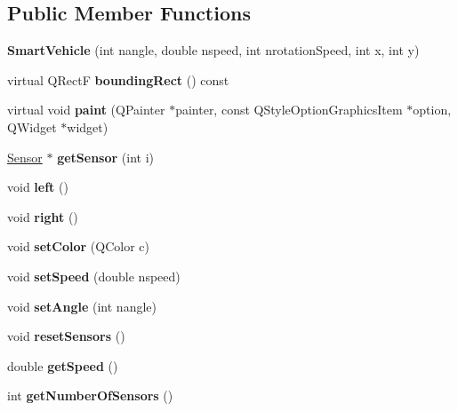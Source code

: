 \subsection*{Public Member Functions}
\begin{DoxyCompactItemize}
\item 
\mbox{\label{class_smart_vehicle_a860c279d1237b674cb97dbf8fa0c0caa}} 
{\bfseries Smart\+Vehicle} (int nangle, double nspeed, int nrotation\+Speed, int x, int y)
\item 
\mbox{\label{class_smart_vehicle_afeaf1fc079e565e04cc54aeaca37f009}} 
virtual Q\+RectF {\bfseries bounding\+Rect} () const
\item 
\mbox{\label{class_smart_vehicle_af241f76f0a49fbe6f4bf6754765c0165}} 
virtual void {\bfseries paint} (Q\+Painter $\ast$painter, const Q\+Style\+Option\+Graphics\+Item $\ast$option, Q\+Widget $\ast$widget)
\item 
\mbox{\label{class_smart_vehicle_aa2c268069ba993619c389356ff37ee81}} 
\mbox{\hyperlink{class_sensor}{Sensor}} $\ast$ {\bfseries get\+Sensor} (int i)
\item 
\mbox{\label{class_smart_vehicle_a179e209c01fe810fa0ddc80e9bd43f4d}} 
void {\bfseries left} ()
\item 
\mbox{\label{class_smart_vehicle_afae0834eded3c64f6c86ba65e40d3cb7}} 
void {\bfseries right} ()
\item 
\mbox{\label{class_smart_vehicle_a07331c47cda1eac0b0e361d928528301}} 
void {\bfseries set\+Color} (Q\+Color c)
\item 
\mbox{\label{class_smart_vehicle_a34651fae46b40981c089396b534d049a}} 
void {\bfseries set\+Speed} (double nspeed)
\item 
\mbox{\label{class_smart_vehicle_a87ffff9d67d4ca184761679be391a420}} 
void {\bfseries set\+Angle} (int nangle)
\item 
\mbox{\label{class_smart_vehicle_a46108297333e9498b7ee4a9fedcedcd1}} 
void {\bfseries reset\+Sensors} ()
\item 
\mbox{\label{class_smart_vehicle_ad10b34691deb1f4548d65d947e80b321}} 
double {\bfseries get\+Speed} ()
\item 
\mbox{\label{class_smart_vehicle_aa69d1e80908e922a5559af3e1ba122fc}} 
int {\bfseries get\+Number\+Of\+Sensors} ()
\end{DoxyCompactItemize}
